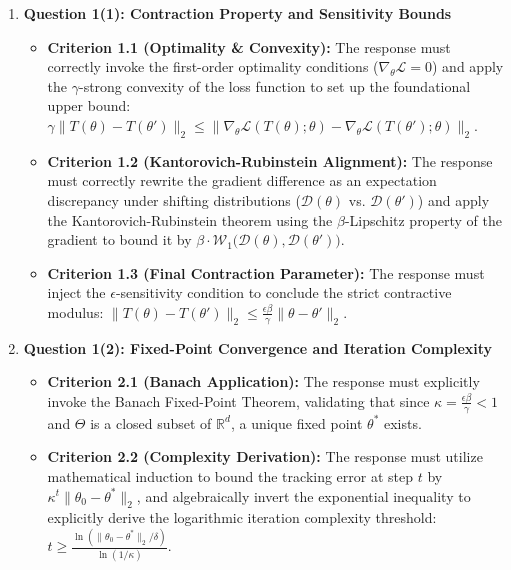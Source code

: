 \documentclass[../../../main.tex]{subfiles}
\begin{document}
\begin{msbproblem}
\begin{gradingscheme}
\begin{enumerate}[label=\arabic*.]
\item \textbf{Question 1(1): Contraction Property and Sensitivity Bounds}
\begin{itemize}
\item \textbf{Criterion 1.1 (Optimality \& Convexity):} The response must correctly invoke the first-order optimality conditions ($\nabla_\theta \mathcal{L} = 0$) and apply the $\gamma$-strong convexity of the loss function to set up the foundational upper bound: $\gamma \|T(\theta) - T(\theta')\|_2 \le \| \nabla_\theta \mathcal{L}(T(\theta); \theta) - \nabla_\theta \mathcal{L}(T(\theta'); \theta) \|_2$.
\item \textbf{Criterion 1.2 (Kantorovich-Rubinstein Alignment):} The response must correctly rewrite the gradient difference as an expectation discrepancy under shifting distributions ($\mathcal{D}(\theta)$ vs. $\mathcal{D}(\theta')$) and apply the Kantorovich-Rubinstein theorem using the $\beta$-Lipschitz property of the gradient to bound it by $\beta \cdot \mathcal{W}_1\big(\mathcal{D}(\theta), \mathcal{D}(\theta')\big)$.
\item \textbf{Criterion 1.3 (Final Contraction Parameter):} The response must inject the $\epsilon$-sensitivity condition to conclude the strict contractive modulus: $\|T(\theta) - T(\theta')\|_2 \le \frac{\epsilon\beta}{\gamma} \|\theta - \theta'\|_2$.
\end{itemize}

\item \textbf{Question 1(2): Fixed-Point Convergence and Iteration Complexity}
\begin{itemize}
\item \textbf{Criterion 2.1 (Banach Application):} The response must explicitly invoke the Banach Fixed-Point Theorem, validating that since $\kappa = \frac{\epsilon\beta}{\gamma} < 1$ and $\Theta$ is a closed subset of $\mathbb{R}^d$, a unique fixed point $\theta^*$ exists.
\item \textbf{Criterion 2.2 (Complexity Derivation):} The response must utilize mathematical induction to bound the tracking error at step $t$ by $\kappa^t \|\theta_0 - \theta^*\|_2$, and algebraically invert the exponential inequality to explicitly derive the logarithmic iteration complexity threshold: $t \ge \frac{\ln\left(\|\theta_0 - \theta^*\|_2 / \delta\right)}{\ln(1/\kappa)}$.
\end{itemize}


\end{enumerate}
\end{gradingscheme}
\end{msbproblem}
\end{document}
